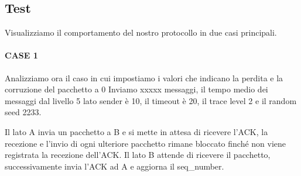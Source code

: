 \documentclass[a4paper]{article}
\begin{document}
\subsection{Test}
Visualizziamo il comportamento del nostro protocollo in due casi principali.
\paragraph{CASE 1} 
\par Analizziamo ora il caso in cui impostiamo i valori che indicano la perdita e la corruzione del pacchetto a 0 Inviamo xxxxx messaggi, il tempo medio dei messaggi dal livello 5 lato sender è 10, il timeout è 20, il trace level 2 e il random seed 2233.
\par Il lato A invia un pacchetto a B e si mette in attesa di ricevere l’ACK, 
la recezione e l’invio di ogni ulteriore pacchetto rimane bloccato finché non viene registrata la recezione dell’ACK. Il lato B attende di ricevere il pacchetto, successivamente invia l’ACK ad A e aggiorna il seq\_number.
\end{document}
